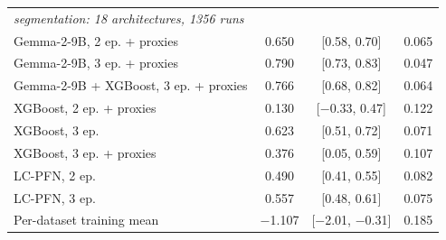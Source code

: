 \begin{table}[t]
\begin{tabular}{lccc}
\midrule
\multicolumn{4}{l}{\textit{segmentation: 18 architectures, 1356 runs}} \\
\quad Gemma-2-9B, 2 ep. + proxies & 0.650 & [0.58, 0.70] & 0.065 \\
\quad Gemma-2-9B, 3 ep. + proxies & 0.790 & [0.73, 0.83] & 0.047 \\
\quad Gemma-2-9B + XGBoost, 3 ep. + proxies & 0.766 & [0.68, 0.82] & 0.064 \\
\quad XGBoost, 2 ep. + proxies & 0.130 & [$-$0.33, 0.47] & 0.122 \\
\quad XGBoost, 3 ep. & 0.623 & [0.51, 0.72] & 0.071 \\
\quad XGBoost, 3 ep. + proxies & 0.376 & [0.05, 0.59] & 0.107 \\
\quad LC-PFN, 2 ep. & 0.490 & [0.41, 0.55] & 0.082 \\
\quad LC-PFN, 3 ep. & 0.557 & [0.48, 0.61] & 0.075 \\
\quad Per-dataset training mean & $-$1.107 & [$-$2.01, $-$0.31] & 0.185 \\
\bottomrule
\end{tabular}
\end{table}
